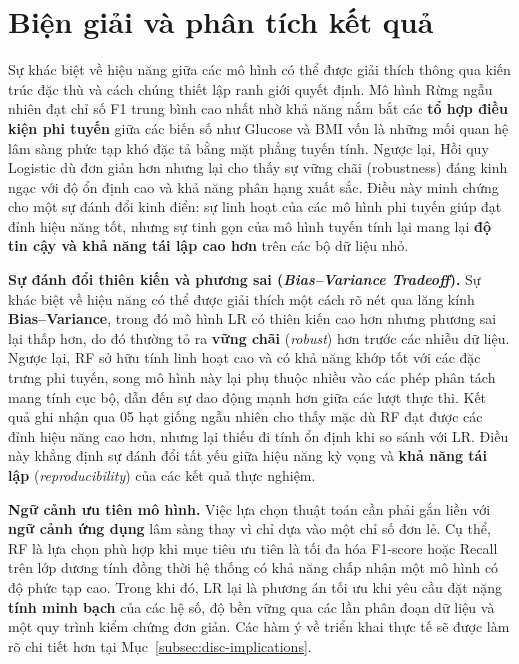 \documentclass[14pt,a4paper]{extreport}
\begin{document}
\section{Biện giải và phân tích kết quả}
\label{subsec:disc-results}

Sự khác biệt về hiệu năng giữa các mô hình có thể được giải thích thông qua kiến trúc đặc thù và cách chúng thiết lập ranh giới quyết định. Mô hình Rừng ngẫu nhiên đạt chỉ số F1 trung bình cao nhất nhờ khả năng nắm bắt các \textbf{tổ hợp điều kiện phi tuyến} giữa các biến số như Glucose và BMI vốn là những mối quan hệ lâm sàng phức tạp khó đặc tả bằng mặt phẳng tuyến tính. Ngược lại, Hồi quy Logistic dù đơn giản hơn nhưng lại cho thấy sự vững chãi (robustness) đáng kinh ngạc với độ ổn định cao và khả năng phân hạng xuất sắc. Điều này minh chứng cho một sự đánh đổi kinh điển: sự linh hoạt của các mô hình phi tuyến giúp đạt đỉnh hiệu năng tốt, nhưng sự tinh gọn của mô hình tuyến tính lại mang lại \textbf{độ tin cậy và khả năng tái lập cao hơn} trên các bộ dữ liệu nhỏ.

\textbf{Sự đánh đổi thiên kiến và phương sai (\textit{Bias--Variance Tradeoff}).}
Sự khác biệt về hiệu năng có thể được giải thích một cách rõ nét qua lăng kính \textbf{Bias--Variance}, trong đó mô hình LR có thiên kiến cao hơn nhưng phương sai lại thấp hơn, do đó thường tỏ ra \textbf{vững chãi} (\textit{robust}) hơn trước các nhiễu dữ liệu. Ngược lại, RF sở hữu tính linh hoạt cao và có khả năng khớp tốt với các đặc trưng phi tuyến, song mô hình này lại phụ thuộc nhiều vào các phép phân tách mang tính cục bộ, dẫn đến sự dao động mạnh hơn giữa các lượt thực thi. Kết quả ghi nhận qua 05 hạt giống ngẫu nhiên cho thấy mặc dù RF đạt được các đỉnh hiệu năng cao hơn, nhưng lại thiếu đi tính ổn định khi so sánh với LR. Điều này khẳng định sự đánh đổi tất yếu giữa hiệu năng kỳ vọng và \textbf{khả năng tái lập} (\textit{reproducibility}) của các kết quả thực nghiệm.

\textbf{Ngữ cảnh ưu tiên mô hình.}
Việc lựa chọn thuật toán cần phải gắn liền với \textbf{ngữ cảnh ứng dụng} lâm sàng thay vì chỉ dựa vào một chỉ số đơn lẻ. Cụ thể, RF là lựa chọn phù hợp khi mục tiêu ưu tiên là tối đa hóa F1-score hoặc Recall trên lớp dương tính đồng thời hệ thống có khả năng chấp nhận một mô hình có độ phức tạp cao. Trong khi đó, LR lại là phương án tối ưu khi yêu cầu đặt nặng \textbf{tính minh bạch} của các hệ số, độ bền vững qua các lần phân đoạn dữ liệu và một quy trình kiểm chứng đơn giản. Các hàm ý về triển khai thực tế sẽ được làm rõ chi tiết hơn tại Mục~\ref{subsec:disc-implications}.
\end{document}
